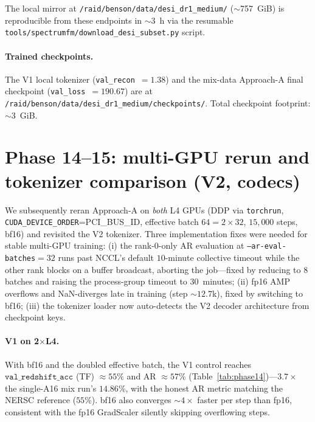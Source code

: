\documentclass[11pt,letterpaper]{article}
\newcommand{\valz}{\texttt{val\_redshift\_acc}}
\begin{document}
The local mirror at \texttt{/raid/benson/data/desi\_dr1\_medium/}
($\sim$757~GiB) is reproducible from these endpoints in $\sim$3~h
via the resumable
\texttt{tools/spectrumfm/download\_desi\_subset.py} script.

\paragraph{Trained checkpoints.} The V1 local tokenizer
(\texttt{val\_recon}~$=1.38$) and the mix-data Approach-A final
checkpoint (\texttt{val\_loss}~$=190.67$) are at
\texttt{/raid/benson/data/desi\_dr1\_medium/checkpoints/}.
Total checkpoint footprint: $\sim$3~GiB.

\section{Phase 14--15: multi-GPU rerun and tokenizer comparison (V2, codecs)}
\label{sec:phase14}

We subsequently reran Approach-A on \emph{both} L4 GPUs (DDP via
\texttt{torchrun}, \texttt{CUDA\_DEVICE\_ORDER}{=}\textsf{PCI\_BUS\_ID},
effective batch $64 = 2{\times}32$, $15{,}000$ steps, bf16) and revisited
the V2 tokenizer. Three implementation fixes were needed for stable
multi-GPU training: (i) the rank-0-only AR evaluation at
\texttt{--ar-eval-batches}${=}32$ runs past NCCL's default $10$-minute
collective timeout while the other rank blocks on a buffer broadcast,
aborting the job---fixed by reducing to $8$ batches and raising the
process-group timeout to $30$~minutes; (ii) fp16 AMP overflows and
NaN-diverges late in training (step ${\sim}12.7$k), fixed by switching to
bf16; (iii) the tokenizer loader now auto-detects the V2 decoder
architecture from checkpoint keys.

\paragraph{V1 on 2$\times$L4.} With bf16 and the doubled effective batch,
the V1 control reaches $\valz$ (TF) ${\approx}55\%$ and AR ${\approx}57\%$
(Table~\ref{tab:phase14})---$3.7\times$ the single-A16 mix run's
$14.86\%$, with the honest AR metric matching the NERSC reference
($55\%$). bf16 also converges ${\sim}4\times$ faster per step than fp16,
consistent with the fp16 GradScaler silently skipping overflowing steps.
\end{document}
